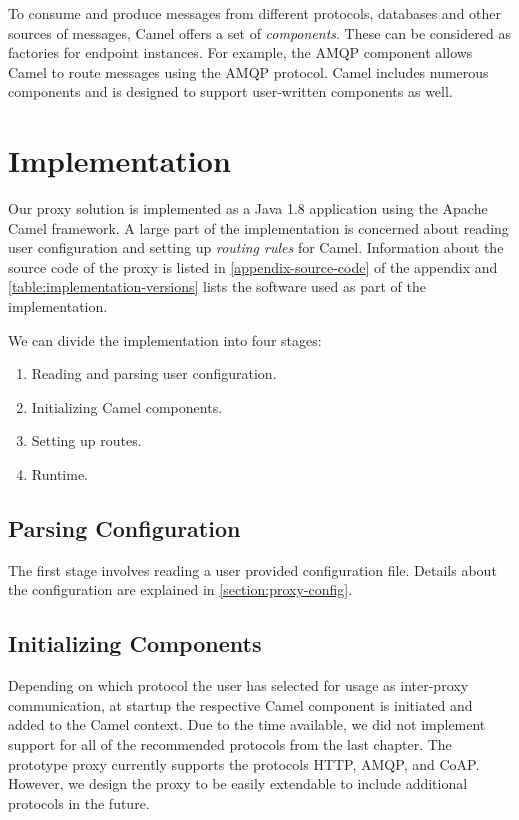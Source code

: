 To consume and produce messages from different protocols, databases and other
sources of messages, Camel offers a set of \textit{components}. These can be
considered as factories for endpoint instances. For example, the AMQP component
allows Camel to route messages using the AMQP protocol. Camel includes numerous
components and is designed to support user-written components as well.


\section{Implementation}

Our proxy solution is implemented as a Java 1.8 application using the Apache Camel
framework. A large part of the implementation is concerned about reading user
configuration and setting up \textit{routing rules} for Camel. Information about
the source code of the proxy is listed in \cref{appendix-source-code} of the
appendix and \cref{table:implementation-versions} lists the software used as
part of the implementation.

We can divide the implementation into four stages:

\begin{enumerate}
    \item Reading and parsing user configuration.
    \item Initializing Camel components.
    \item Setting up routes.
    \item Runtime.
\end{enumerate}

\subsection{Parsing Configuration}

The first stage involves reading a user provided configuration file. Details
about the configuration are explained in \cref{section:proxy-config}.

\subsection{Initializing Components}

Depending on which protocol the user has selected for usage as inter-proxy
communication, at startup the respective Camel component is initiated and added
to the Camel context. Due to the time available, we did not implement support
for all of the recommended protocols from the last chapter. The prototype proxy
currently supports the protocols HTTP, AMQP, and CoAP. However, we design the
proxy to be easily extendable to include additional protocols in the future.

